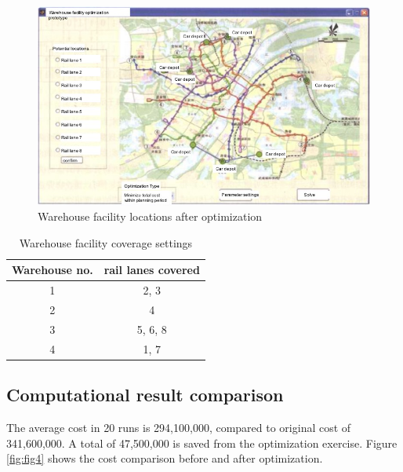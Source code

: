 \begin{figure}[h!]
	\begin{center}
		\includegraphics[width=0.8\linewidth]{sections/figure3.jpg}
		\caption{Warehouse facility locations after optimization}
		\label{fig:fig3}
	\end{center}
\end{figure}

\begin{table}[h!]
	\begin{center}
		\caption{Warehouse facility coverage settings}
		\label{tab:tab2}
		\begin{tabular}{cc}
			\hline
			Warehouse no. & rail lanes covered \\
			\hline
			1 & 2, 3\\
			2 & 4 \\
			3 & 5, 6, 8\\
			4 & 1, 7\\
			\hline
		\end{tabular}
	\end{center}
\end{table}

\subsection{Computational result comparison}
The average cost in 20 runs is 294,100,000, compared to original cost of 341,600,000.
A total of 47,500,000 is saved from the optimization exercise.
Figure \ref{fig:fig4} shows the cost comparison before and after optimization.

